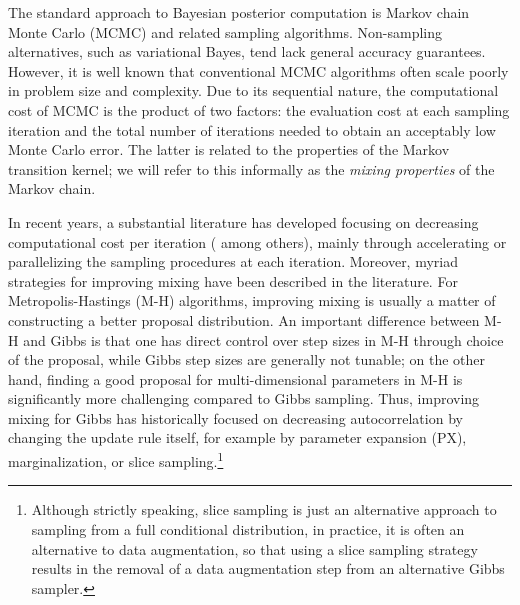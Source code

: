 \documentclass[12pt]{article}
\begin{document}
The standard approach to Bayesian posterior computation is Markov chain Monte Carlo (MCMC) and related sampling algorithms. Non-sampling alternatives, such as variational Bayes, tend lack general accuracy guarantees. However, it is well known that conventional MCMC algorithms often scale poorly in problem size and complexity. Due to its sequential nature, the computational cost of MCMC is the product of two factors: the evaluation cost at each sampling iteration and the total number of iterations needed to obtain an acceptably low Monte Carlo error. The latter is related to the properties of the Markov transition kernel; we will refer to this informally as the \emph{mixing properties} of the Markov chain. 

In recent years, a substantial literature has developed focusing on decreasing computational cost per iteration (\cite{minsker2014robust,srivastava2015wasp,conrad2015accelerating} among others), mainly through accelerating or parallelizing the sampling procedures at each iteration. Moreover, myriad strategies for improving mixing have been described in the literature. For Metropolis-Hastings (M-H) algorithms, improving mixing is usually a matter of constructing a better proposal distribution. An important difference between M-H and Gibbs is that one has direct control over step sizes in M-H through choice of the proposal, while Gibbs step sizes are generally not tunable; on the other hand, finding a good proposal for multi-dimensional parameters in M-H is significantly more challenging compared to Gibbs sampling. Thus, improving mixing for Gibbs has historically focused on decreasing autocorrelation by changing the update rule itself, for example by parameter expansion (PX), marginalization, or slice sampling.\footnote{Although strictly speaking, slice sampling is just an alternative approach to sampling from a full conditional distribution, in practice, it is often an alternative to data augmentation, so that using a slice sampling strategy results in the removal of a data augmentation step from an alternative Gibbs sampler.} 
\end{document}
